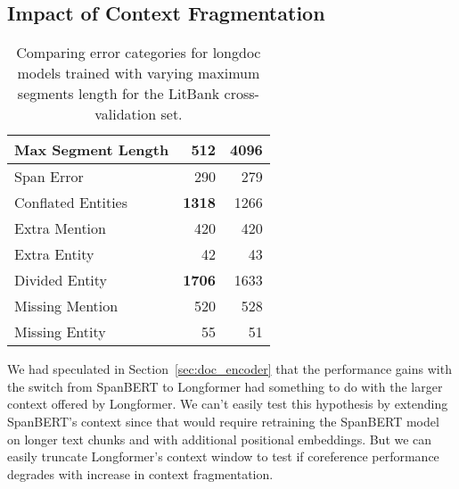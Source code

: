 \documentclass[12pt]{thesis-umich}[thesis]
\begin{document}
\subsection{Impact of Context Fragmentation}
\label{sec:context_frag}
\begin{table*}[!ht]

\footnotesize
{}
\caption{Detailed results of context fragmentation for the LitBank validation set.}
\label{tab:litbank_encoder_len}
\end{table*}




 \begin{table*}[t]
    \centering
\begin{tabular}{lrr}
\toprule
Max Segment Length  & 512  & 4096 \\
\midrule
Span Error         & 290  & 279  \\
Conflated Entities & \textbf{1318} & 1266 \\
Extra Mention      & 420  & 420  \\
Extra Entity       & 42   & 43   \\
Divided Entity     & \textbf{1706} & 1633 \\
Missing Mention    & 520  & 528  \\
Missing Entity     & 55   & 51  \\\bottomrule
\end{tabular}
\caption{Comparing error categories for longdoc models trained with varying maximum segments length for the LitBank cross-validation set. }
\label{tab:context_frag_error}
\end{table*} 
We had speculated in Section~\ref{sec:doc_encoder} that the performance gains with the switch from SpanBERT to Longformer had something to do with the larger context offered by Longformer.
We can't easily test this hypothesis by extending SpanBERT's context since that would require retraining the SpanBERT model on longer text chunks and with additional positional embeddings. 
But we can easily truncate Longformer's context window to test if coreference performance degrades with increase in context fragmentation. 
\end{document}
